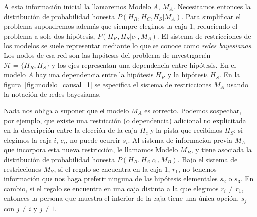 \documentclass[a4paper,11pt]{book}
\theoremstyle{definition}
\begin{document}

A esta información inicial la llamaremos Modelo $A$, $M_A$.
%
Necesitamos entonces la distribución de probabilidad honesta $P(H_R,H_C,H_S|M_A)$.
%
Para simplificar el problema supondremos además que siempre elegimos la caja 1, reduciendo el problema a solo dos hipótesis, $P(H_R,H_S|c_1, M_A)$.
%
El sistema de restricciones de los modelos se suele representar mediante lo que se conoce como \emph{redes bayesianas}.
%
Los nodos de esa red son las hipótesis del problema de investigación $\mathcal{H} = \{H_R, H_S\}$ y los ejes representan una dependencia entre hipótesis.
%
En el modelo $A$ hay una dependencia entre la hipótesis $H_R$ y la hipótesis $H_S$.
%
En la figura~\ref{fig:modelo_causal_1} se especifica el sistema de restricciones $M_A$ usando la notación de redes bayesianas.


Nada nos obliga a suponer que el modelo $M_A$ es correcto.
%
Podemos sospechar, por ejemplo, que existe una restricción (o dependencia) adicional no explicitada en la descripción entre la elección de la caja $H_c$ y la pista que recibimos $H_S$: si elegimos la caja $i$, $c_i$, no puede ocurrir $s_i$.
%
Al sistema de información previa $M_A$ que incorpora esta nueva restricción, le llamamos Modelo $M_B$, y tiene asociada la distribución de probabilidad honesta $P(H_R,H_S|c_1,M_B)$.
%
Bajo el sistema de restricciones $M_B$, si el regalo se encuentra en la caja 1, $r_1$, no tenemos información que nos haga preferir ninguna de las hipótesis elementales $s_2$ o $s_3$.
%
En cambio, si el regalo se encuentra en una caja distinta a la que elegimos $r_i \neq r_1$, entonces la persona que muestra el interior de la caja tiene una única opción, $s_j$ con $j\neq i$ y $j\neq 1$.
\end{document}
